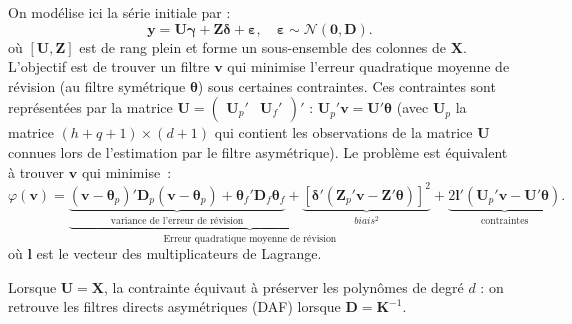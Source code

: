 \documentclass[
  12pt,
  a4paper,french]{article}
\newcommand\1{\mathds{1}}
\begin{document}
On modélise ici la série initiale par :
\begin{equation}
\boldsymbol y=\boldsymbol U\boldsymbol \gamma+\boldsymbol Z\boldsymbol \delta+\boldsymbol \varepsilon,\quad
\boldsymbol \varepsilon\sim\mathcal{N}(\boldsymbol 0,\boldsymbol D).
\label{eq:lpgeneralmodel}
\end{equation}
où \([\boldsymbol U,\boldsymbol Z]\) est de rang plein et forme un sous-ensemble des colonnes de \(\boldsymbol X\).
L'objectif est de trouver un filtre \(\boldsymbol v\) qui minimise l'erreur quadratique moyenne de révision (au filtre symétrique \(\boldsymbol \theta\)) sous certaines contraintes.
Ces contraintes sont représentées par la matrice \(\boldsymbol U=\begin{pmatrix}\boldsymbol U_{p}'&\boldsymbol U_{f}'\end{pmatrix}'\) : \(\boldsymbol U_p'\boldsymbol v=\boldsymbol U'\boldsymbol \theta\) (avec \(\boldsymbol U_p\) la matrice \((h+q+1)\times (d+1)\) qui contient les observations de la matrice \(\boldsymbol U\) connues lors de l'estimation par le filtre asymétrique).
Le problème est équivalent à trouver \(\boldsymbol v\) qui minimise~:
\begin{equation}
\varphi(\boldsymbol v)=
\underbrace{
  \underbrace{(\boldsymbol v-\boldsymbol \theta_{p})'\boldsymbol D_{p}(\boldsymbol v-\boldsymbol \theta_{p})+
  \boldsymbol \theta_{f}'\boldsymbol D_{f}\boldsymbol \theta_{f}}_\text{variance de l'erreur de révision}+
  \underbrace{[\boldsymbol \delta'(\boldsymbol Z_{p}'\boldsymbol v-\boldsymbol Z'\boldsymbol \theta)]^{2}}_{biais^2}
}_\text{Erreur quadratique moyenne de révision}+
\underbrace{2\boldsymbol l'(\boldsymbol U_{p}'\boldsymbol v-\boldsymbol U'\boldsymbol \theta)}_{\text{contraintes}}.
\label{eq:lppasym}
\end{equation}
où \(\boldsymbol l\) est le vecteur des multiplicateurs de Lagrange.

Lorsque \(\boldsymbol U=\boldsymbol X\), la contrainte équivaut à préserver les polynômes de degré \(d\) : on retrouve les filtres directs asymétriques (DAF) lorsque \(\boldsymbol D=\boldsymbol K^{-1}\).
\end{document}
